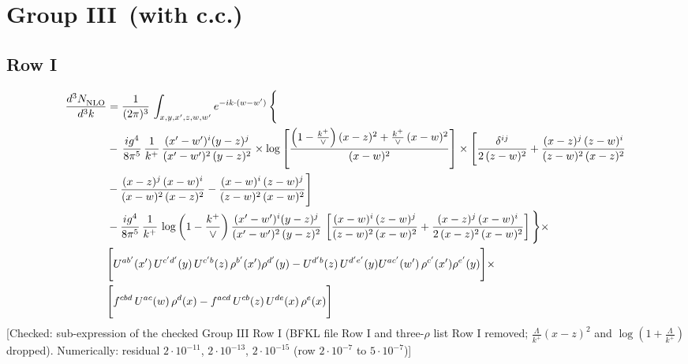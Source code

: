 \documentclass[9pt]{article}
\numberwithin{equation}{section}
\begin{document}
\section{Group III\, (with c.c.)}
\subsection{Row I}
\begin{align}
     \frac{d^{3}N_{\rm NLO}^{\rm}}{d^{3}k}  & =   \frac{1}{(2\pi)^{3}}\, \int_{x,y,x',z,w,w^{\prime}} e^{-ik\cdot (w-w')}\, \Bigg\{\notag \\
& -\,\frac{ig^{4}}{8\pi^{5}}\,\frac{1}{k^{+}}\,\frac{(x'-w')^{i}(y-z)^{j}}{(x'-w')^{2}\,(y-z)^{2}}\times \log{\left[\frac{\left(1-\frac{k^{+}}{\vee}\right)(x-z)^{2}+\frac{k^{+}}{\vee}\,(x-w)^{2}}{(x-w)^{2}}\right]}\times \Bigg[\frac{\delta^{ij}}{2\,(z-w)^{2}}+\frac{(x-z)^{j}\,(z-w)^{i}}{(z-w)^{2}\,(x-z)^{2}}\notag \\ & -\frac{(x-z)^{j}\,(x-w)^{i}}{(x-w)^{2}\,(x-z)^{2}}-\frac{(x-w)^{i}\,(z-w)^{j}}{(z-w)^{2}\,(x-w)^{2}}\Bigg] \notag \\
& -\frac{ig^{4}}{8\pi^{5}}\,\frac{1}{k^{+}}\,\log{\left(1-\frac{k^{+}}{\vee}\right)}\,\frac{(x'-w')^{i}(y-z)^{j}}{(x'-w')^{2}\,(y-z)^{2}}\,\left[\frac{(x-w)^{i}\,(z-w)^{j}}{(z-w)^{2}\,(x-w)^{2}}+\frac{(x-z)^{j}\,(x-w)^{i}}{2\,(x-z)^{2}\, (x-w)^{2}}\right]\Bigg\}\times \notag \\ &  \Bigg[U^{ab'}(x')\,U^{c'd'}(y)\,U^{c'b}(z)\,\rho^{b'}(x')\rho^{d'}(y)-U^{d'b}(z)\,U^{d'e'}(y)U^{ac'}(w')\,\rho^{c'}(x')\rho^{e'}(y)\Bigg]\times\notag \\ & \Bigg[f^{cbd}\,U^{ac}(w)\,\rho^{d}(x)-f^{acd}\, U^{cb}(z)\,U^{de}(x)\,\rho^{e}(x)\Bigg]
\end{align} {\color{red}[Checked: sub-expression of the checked Group III Row I (BFKL file Row I and three-$\rho$ list Row I removed; $\frac{\Lambda}{k^{+}}(x-z)^{2}$ and $\log(1+\frac{\Lambda}{k^{+}})$ dropped). Numerically: residual $2\cdot10^{-11}$, $2\cdot10^{-13}$, $2\cdot10^{-15}$ (row $2\cdot10^{-7}$ to $5\cdot10^{-7}$)]}\par\noindent
\end{document}
